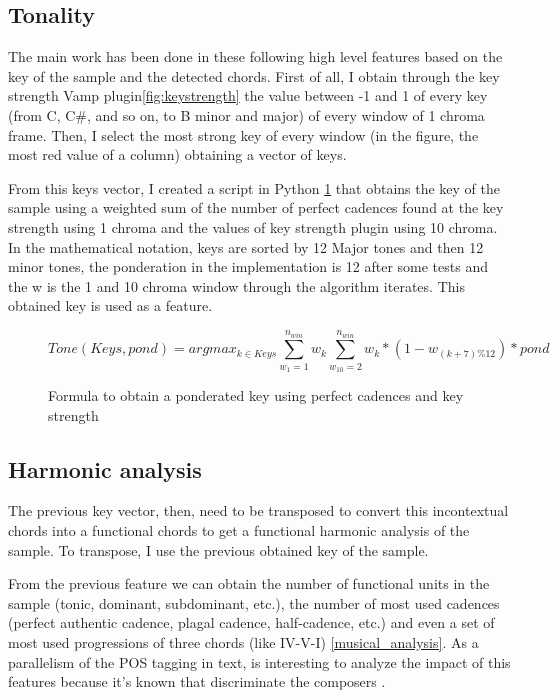 \documentclass[a4paper,openany,oneside,12pt]{book}
\begin{document}
\subsection{Tonality}\label{subsec:chord_windows}
The main work has been done in these following high level features based on the key of the sample and the detected chords. First of all, I obtain through the key strength Vamp plugin\ref{fig:keystrength} the value between -1 and 1 of every key (from C, C\#, and so on, to B minor and major) of every window of 1 chroma frame. Then, I select the most strong key of every window (in the figure, the most red value of a column) obtaining a vector of keys.

From this keys vector, I created a script in Python \ref{fig:keyFormula} that obtains the key of the sample using a weighted sum of the number of perfect cadences found at the key strength using 1 chroma and the values of key strength plugin using 10 chroma. In the mathematical notation, keys are sorted by 12 Major tones and then 12 minor tones, the ponderation in the implementation is 12 after some tests and the w is the 1 and 10 chroma window through the algorithm iterates. This obtained key is used as a feature.

\begin{figure}

\[ Tone(Keys,pond) = argmax_{k \in Keys} \sum_{w_{1}=1}^{n_{win}} w_k \sum_{w_{10}=2}^{n_{win}} w_k * (1-w_{(k+7)\%12})*pond \]
\caption{Formula to obtain a ponderated key using perfect cadences and key strength} \label{fig:keyFormula}
\end{figure}


\subsection{Harmonic analysis}\label{subsec:uni_bi_tri}
The previous key vector, then, need to be transposed to convert this incontextual chords into a functional chords to get a functional harmonic analysis of the sample. To transpose, I use the previous obtained key of the sample.

From the previous feature we can obtain the number of functional units in the sample (tonic, dominant, subdominant, etc.), the number of most used cadences (perfect authentic cadence, plagal cadence, half-cadence, etc.) and even a set of most used progressions of three chords (like IV-V-I) \ref{musical_analysis}. As a parallelism of the POS tagging in text, is interesting to analyze the impact of this features because it's known that discriminate the composers \cite{desportes}.
\end{document}
